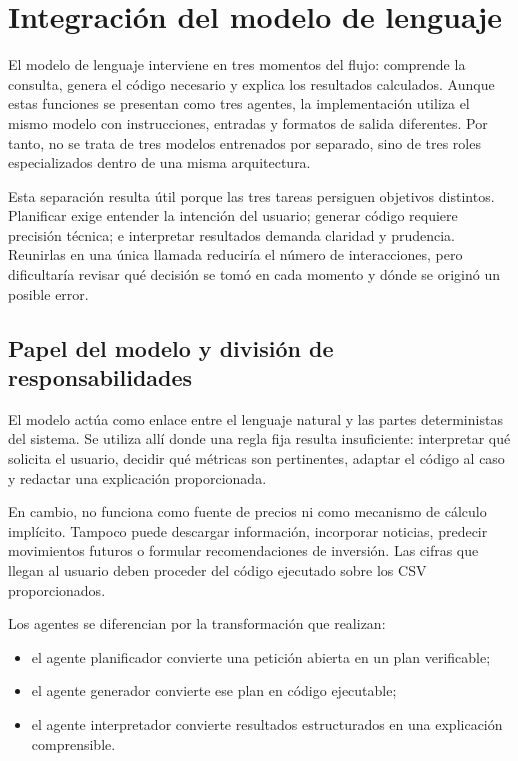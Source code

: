 \chapter{Integración del modelo de lenguaje}

El modelo de lenguaje interviene en tres momentos del flujo: comprende la consulta, genera el código necesario y explica los resultados calculados. Aunque estas funciones se presentan como tres agentes, la implementación utiliza el mismo modelo con instrucciones, entradas y formatos de salida diferentes. Por tanto, no se trata de tres modelos entrenados por separado, sino de tres roles especializados dentro de una misma arquitectura.

Esta separación resulta útil porque las tres tareas persiguen objetivos distintos. Planificar exige entender la intención del usuario; generar código requiere precisión técnica; e interpretar resultados demanda claridad y prudencia. Reunirlas en una única llamada reduciría el número de interacciones, pero dificultaría revisar qué decisión se tomó en cada momento y dónde se originó un posible error.

\section{Papel del modelo y división de responsabilidades}

El modelo actúa como enlace entre el lenguaje natural y las partes deterministas del sistema. Se utiliza allí donde una regla fija resulta insuficiente: interpretar qué solicita el usuario, decidir qué métricas son pertinentes, adaptar el código al caso y redactar una explicación proporcionada.

En cambio, no funciona como fuente de precios ni como mecanismo de cálculo implícito. Tampoco puede descargar información, incorporar noticias, predecir movimientos futuros o formular recomendaciones de inversión. Las cifras que llegan al usuario deben proceder del código ejecutado sobre los CSV proporcionados.

Los agentes se diferencian por la transformación que realizan:

\begin{itemize}
    \item el agente planificador convierte una petición abierta en un plan verificable;
    \item el agente generador convierte ese plan en código ejecutable;
    \item el agente interpretador convierte resultados estructurados en una explicación comprensible.
\end{itemize}

